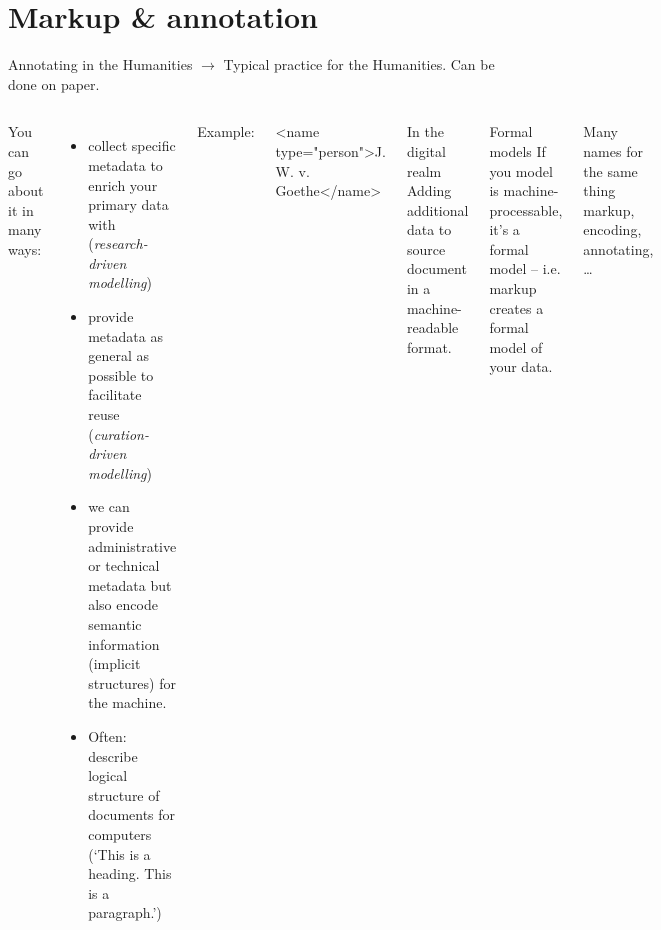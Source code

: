 
\section{Markup \& annotation}

\begin{frame}[fragile]{Annotating in the Humanities}
\small{}
$\to$ Typical practice for the Humanities. Can be done on paper.

\begin{columns}
You can go about it in many ways:
\begin{itemize}\footnotesize
\item collect specific metadata to enrich your primary data with (\emph{research-driven modelling})
\item provide metadata as general as possible to facilitate reuse (\emph{curation-driven modelling})
\item we can provide administrative or technical metadata but also encode semantic information (implicit structures) for the machine.
\item Often: describe logical structure of documents for computers (`This is a heading. This is a paragraph.')
\end{itemize}

Example: 
\begin{xmlcode}
<name type="person">J. W. v. Goethe</name>
\end{xmlcode}

\begin{block}{In the digital realm}\footnotesize
Adding additional data to source document in a machine-readable format.
\end{block} 
\begin{block}{Formal models}\footnotesize
If you model is machine-processable, it's a formal model -- i.e. markup creates a formal model of your data.
\end{block}

\begin{block}{Many names for the same thing}
\footnotesize
markup, encoding, annotating, \dots
\end{block}
\end{columns}

\end{frame}

